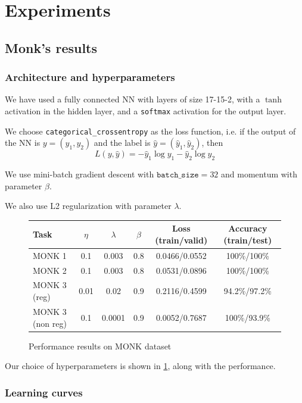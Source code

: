 \section{Experiments}

\subsection{Monk's results}

\subsubsection{Architecture and hyperparameters}
We have used a fully connected NN with layers of size 17-15-2, with a $\tanh$ activation in the hidden layer, and a \texttt{softmax} activation for the output layer.

We choose \texttt{categorical\_crossentropy} as the loss function, i.e. if the output of the NN is $y=(y_1,y_2)$ and the label is $\hat y=(\hat y_1,\hat y_2)$, then $$L(y,\hat y)=-\hat y_1\log y_1-\hat y_2\log y_2$$

We use mini-batch gradient descent with $\texttt{batch\_size}=32$ and momentum with parameter $\beta$.

We also use L2 regularization with parameter $\lambda$.

\begin{figure}
    \caption{Performance results on MONK dataset}
    \label{fig:hyper}
    \begin{tabular}{|l|c|c|c|c|c|}
        \hline 
        Task & $\eta$ & $\lambda$ & $\beta$ & Loss (train/valid) & Accuracy (train/test) \\ \hline
        MONK 1 & 0.1 & 0.003 & 0.8 & 0.0466/0.0552  & 100\%/100\% \\ \hline
        MONK 2 & 0.1 & 0.003 & 0.8 & 0.0531/0.0896 & 100\%/100\% \\ \hline
        MONK 3 (reg) & 0.01 & 0.02 & 0.9 & 0.2116/0.4599 & 94.2\%/97.2\% \\ \hline
        MONK 3 (non reg) & 0.1 & 0.0001 & 0.9 & 0.0052/0.7687 & 100\%/93.9\% \\ \hline
    \end{tabular}
\end{figure}

Our choice of hyperparameters is shown in \cref{fig:hyper}, along with the performance.


\subsubsection{Learning curves}

